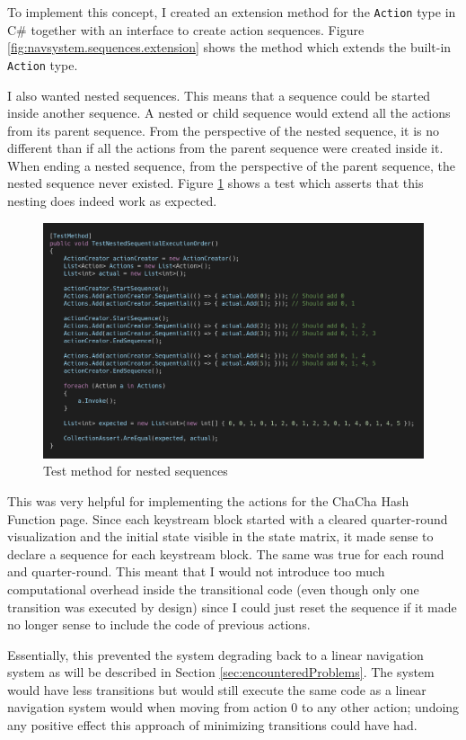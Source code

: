 To implement this concept, I created an extension method for the \texttt{Action} type in C\# together with an interface to create action sequences. Figure \ref{fig:navsystem.sequences.extension} shows the method which extends the built-in \texttt{Action} type.

I also wanted nested sequences. This means that a sequence could be started inside another sequence. A nested or child sequence would extend all the actions from its parent sequence. From the perspective of the nested sequence, it is no different than if all the actions from the parent sequence were created inside it. When ending a nested sequence, from the perspective of the parent sequence, the nested sequence never existed. Figure \ref{fig:navsystem.test} shows a test which asserts that this nesting does indeed work as expected.
\begin{figure}
\centering
\includegraphics[width=\textwidth]{figures/code/nav-arch/TestNestedSequentialExecutionOrder.png}
\caption{Test method for nested sequences}
\label{fig:navsystem.test}
\end{figure}

This was very helpful for implementing the actions for the ChaCha Hash Function page. Since each keystream block started with a cleared quarter-round visualization and the initial state visible in the state matrix, it made sense to declare a sequence for each keystream block. The same was true for each round and quarter-round. This meant that I would not introduce too much computational overhead inside the transitional code (even though only one transition was executed by design) since I could just reset the sequence if it made no longer sense to include the code of previous actions.

Essentially, this prevented the system degrading back to a linear navigation system as will be described in Section \ref{sec:encounteredProblems}. The system would have less transitions but would still execute the same code as a linear navigation system would when moving from action 0 to any other action; undoing any positive effect this approach of minimizing transitions could have had.

